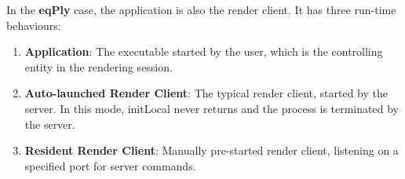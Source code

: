 \documentclass[10pt,a4]{scrartcl}
\begin{document}
In the \textbf{eqPly} case, the application is also the render client. It has
three run-time behaviours:

\begin{enumerate}
  \item \textbf{Application}: The executable started by the user, which
    is the controlling entity in the rendering session.
  \item \textbf{Auto-launched Render Client}: The typical render client,
    started by the server. In this mode, \textsf{initLocal} never
    returns and the process is terminated by the server.
  \item \textbf{Resident Render Client}: Manually pre-started render
    client, listening on a specified port for server commands.
\end{enumerate}
\end{document}
